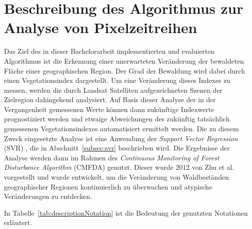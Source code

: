 \section[Beschreibung des Algorithmus]{Beschreibung des Algorithmus zur Analyse von Pixelzeitreihen}
\label{sec:DescriptionOfTheAlgorithm}
Das Ziel des in dieser Bachelorarbeit implementierten und evaluierten Algorithmus ist die Erkennung einer unerwarteten Veränderung der bewaldeten Fläche einer geographischen Region. Der Grad der Bewaldung wird dabei durch einen Vegetationsindex dargestellt. Um eine Veränderung dieses Indexes zu messen, werden die durch Landsat Satelliten aufgezeichneten Szenen der Zielregion dahingehend analysiert. Auf Basis dieser Analyse der in der Vergangenheit gemessenen Werte können dann zukünftige Indexwerte prognostiziert werden und etwaige Abweichungen des zukünftig tatsächlich gemessenen Vegetationsindexes automatisiert ermittelt werden. Die zu diesem Zweck eingesetzte Analyse ist eine Anwendung der \textit{Support Vector Regression} (SVR) \cite{Basak2007}, die in Abschnitt~\ref{subsec:svr} beschrieben wird. Die Ergebnisse der Analyse werden dann im Rahmen des \textit{Continuous Monitoring of Forest Disturbance Algorithm} (CMFDA) \cite{Zhu2012} genutzt. Dieser wurde 2012 von Zhu et al. vorgestellt \cite{Zhu2012} und wurde entwickelt, um die Veränderung von Waldbeständen geographischer Regionen kontinuierlich zu überwachen und atypische Veränderungen zu entdecken. 

In Tabelle~\ref{tab:descriptionNotation} ist die Bedeutung der genutzten Notationen erläutert.

